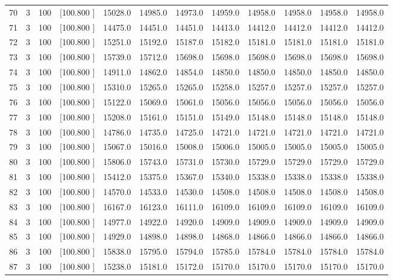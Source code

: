 \documentclass[12pt,a4paper]{article}
\begin{document}
\begin{center}
{\begin{tabular}{r r r r r r r r r r r r}
  70&  3&100&[100.800   ]& 15028.0& 14985.0& 14973.0& 14959.0& 14958.0& 14958.0& 14958.0& 14958.0\\[-0.02in]
  71&  3&100&[100.800   ]& 14475.0& 14451.0& 14451.0& 14413.0& 14412.0& 14412.0& 14412.0& 14412.0\\[-0.02in]
  72&  3&100&[100.800   ]& 15251.0& 15192.0& 15187.0& 15182.0& 15181.0& 15181.0& 15181.0& 15181.0\\[-0.02in]
  73&  3&100&[100.800   ]& 15739.0& 15712.0& 15698.0& 15698.0& 15698.0& 15698.0& 15698.0& 15698.0\\[-0.02in]
  74&  3&100&[100.800   ]& 14911.0& 14862.0& 14854.0& 14850.0& 14850.0& 14850.0& 14850.0& 14850.0\\[-0.02in]
  75&  3&100&[100.800   ]& 15310.0& 15265.0& 15265.0& 15258.0& 15257.0& 15257.0& 15257.0& 15257.0\\[-0.02in]
  76&  3&100&[100.800   ]& 15122.0& 15069.0& 15061.0& 15056.0& 15056.0& 15056.0& 15056.0& 15056.0\\[-0.02in]
  77&  3&100&[100.800   ]& 15208.0& 15161.0& 15151.0& 15149.0& 15148.0& 15148.0& 15148.0& 15148.0\\[-0.02in]
  78&  3&100&[100.800   ]& 14786.0& 14735.0& 14725.0& 14721.0& 14721.0& 14721.0& 14721.0& 14721.0\\[-0.02in]
  79&  3&100&[100.800   ]& 15067.0& 15016.0& 15008.0& 15006.0& 15005.0& 15005.0& 15005.0& 15005.0\\[-0.02in]
  80&  3&100&[100.800   ]& 15806.0& 15743.0& 15731.0& 15730.0& 15729.0& 15729.0& 15729.0& 15729.0\\[-0.02in]
  81&  3&100&[100.800   ]& 15412.0& 15375.0& 15367.0& 15340.0& 15338.0& 15338.0& 15338.0& 15338.0\\[-0.02in]
  82&  3&100&[100.800   ]& 14570.0& 14533.0& 14530.0& 14508.0& 14508.0& 14508.0& 14508.0& 14508.0\\[-0.02in]
  83&  3&100&[100.800   ]& 16167.0& 16123.0& 16111.0& 16109.0& 16109.0& 16109.0& 16109.0& 16109.0\\[-0.02in]
  84&  3&100&[100.800   ]& 14977.0& 14922.0& 14920.0& 14909.0& 14909.0& 14909.0& 14909.0& 14909.0\\[-0.02in]
  85&  3&100&[100.800   ]& 14929.0& 14898.0& 14898.0& 14868.0& 14866.0& 14866.0& 14866.0& 14866.0\\[-0.02in]
  86&  3&100&[100.800   ]& 15838.0& 15795.0& 15794.0& 15785.0& 15784.0& 15784.0& 15784.0& 15784.0\\[-0.02in]
  87&  3&100&[100.800   ]& 15238.0& 15181.0& 15172.0& 15170.0& 15170.0& 15170.0& 15170.0& 15170.0\\[-0.02in]

\end{tabular}}
\end{center}
\end{document}
